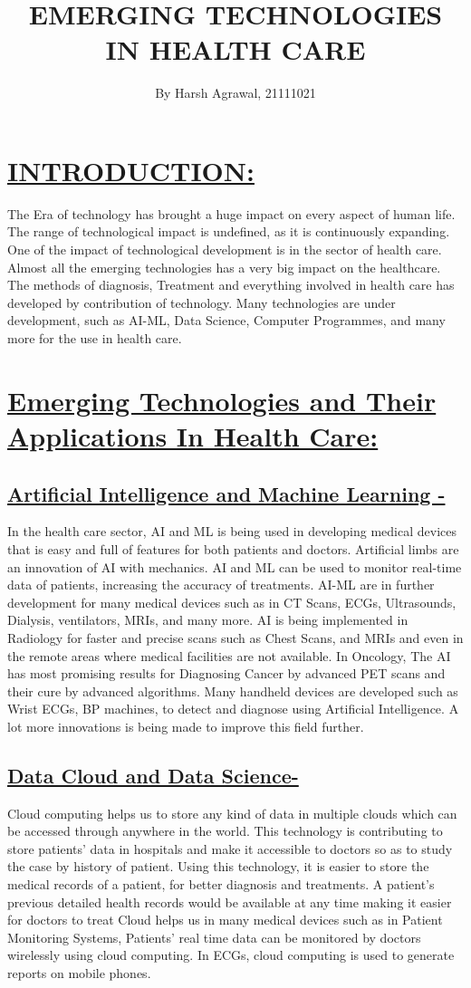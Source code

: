 \documentclass[18pt]{article}
\title{\textbf{EMERGING TECHNOLOGIES IN HEALTH CARE}}
\author{By Harsh Agrawal, 21111021}
\date{}
\begin{document}
\maketitle
\section{\underline{INTRODUCTION:}}
The Era of technology has brought a huge impact on every aspect of human life. The range of technological impact is undefined, as it is continuously expanding.
One of the impact of technological development is in the sector of health care. Almost all the emerging technologies has a very big impact on the healthcare. The methods of diagnosis, Treatment and everything involved in health care has developed by contribution of technology.
Many technologies are under development, such as AI-ML, Data Science, Computer Programmes, and many more for the use in health care.

\section{\underline{ Emerging Technologies and Their Applications In Health Care:}}
\subsection{\underline{Artificial Intelligence and Machine Learning -}}
In the health care sector, AI and ML is being used in developing medical devices that is easy and full of features for both patients and doctors. Artificial limbs are an innovation of AI with mechanics. AI and ML can be used to monitor real-time data of patients, increasing the accuracy of treatments.  AI-ML are in further development for many medical devices such as in CT Scans, ECGs, Ultrasounds, Dialysis, ventilators, MRIs, and many more. AI is being implemented in Radiology for faster and precise scans such as Chest Scans, and MRIs and even in the remote areas where medical facilities are not available. In Oncology, The AI has most promising results for Diagnosing Cancer by advanced PET scans and their cure by advanced algorithms. Many handheld devices are developed such as Wrist ECGs, BP machines, to detect and diagnose using Artificial Intelligence. A lot more innovations is being made to improve this field further.
\subsection{\underline{Data Cloud and Data Science-}}
Cloud computing helps us to store any kind of data in multiple clouds  which can be accessed through anywhere in the world. This technology is contributing to store patients’ data in hospitals and make it accessible to doctors so as to study the case by history of patient. Using this technology, it is easier to store the medical records of a patient, for better diagnosis and treatments. A patient’s previous detailed health records would be available at any time making it easier for doctors to treat
Cloud helps us in many medical devices such as in Patient Monitoring Systems, Patients’ real time data can be monitored by doctors wirelessly using cloud computing. In ECGs, cloud computing is used to generate reports on mobile phones.
\end{document}
